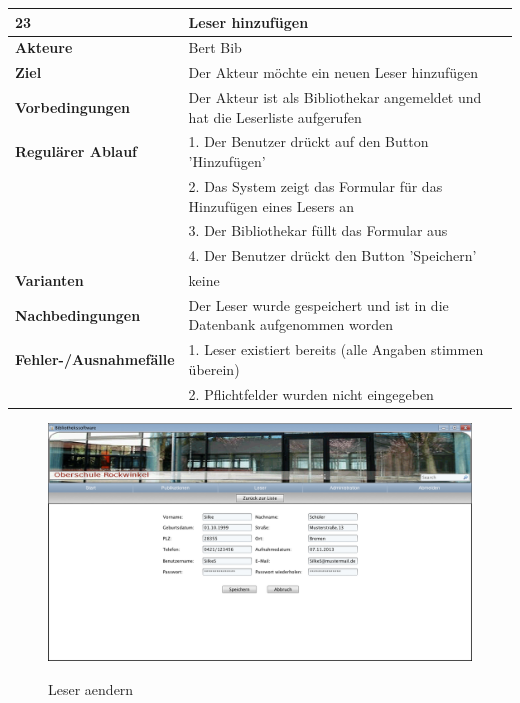\documentclass[fontsize=12pt,paper=a4,twoside]{scrartcl}
\begin{document}
\begin{table}[htbp]
\label{23}
\begin{tabular}{|l|p{10cm}|}
\hline 
\textbf{23} & \textbf{Leser hinzufügen} \\ \hline
\textbf{Akteure} & Bert Bib\\ \hline
\textbf{Ziel} & Der Akteur möchte ein neuen Leser hinzufügen \\ \hline
\textbf{Vorbedingungen} & Der Akteur ist als Bibliothekar angemeldet und hat die Leserliste aufgerufen\\
\hline
\textbf{Regulärer Ablauf} & 
1. Der Benutzer drückt auf den Button 'Hinzufügen' \\
&2. Das System zeigt das Formular für das Hinzufügen eines Lesers an\\
&3. Der Bibliothekar füllt das Formular aus\\
&4. Der Benutzer drückt den Button 'Speichern'\\
\hline
\textbf{Varianten} & 
keine \\ \hline
\textbf{Nachbedingungen} & Der Leser wurde gespeichert und ist in die Datenbank aufgenommen 
worden\\ \hline
\textbf{Fehler-/Ausnahmefälle} & 1. Leser existiert bereits (alle Angaben stimmen überein)\\
&2. Pflichtfelder wurden nicht eingegeben\\
\hline
\end{tabular}
\end{table}

\begin{figure}[htbp]
\caption{Leser aendern}
\includegraphics[width=1\textwidth]{ScreensWebsite/LeserHinzufuegenFilled.png}
  \label{Leser aendern}
\end{figure}
\end{document}
